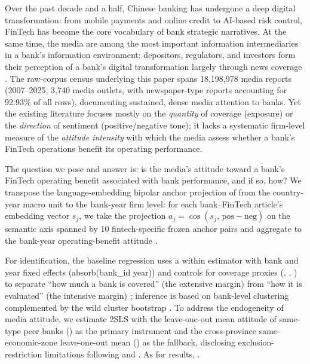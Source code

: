 Over the past decade and a half, Chinese banking has undergone a deep
digital transformation: from mobile payments and online credit to
AI-based risk control, FinTech has become the core vocabulary of bank
strategic narratives. At the same time, the media are among the most
important information intermediaries in a bank's information
environment: depositors, regulators, and investors form their
perception of a bank's digital transformation largely through news
coverage \parencite{tetlock2007content,fang2009media}. The raw-corpus
census underlying this paper spans 18{,}198{,}978 media reports
(2007--2025, 3{,}740 media outlets, with newspaper-type reports
accounting for 92.93\% of all rows), documenting sustained, dense media
attention to banks. Yet the existing literature focuses mostly on the
\emph{quantity} of coverage (exposure) or the \emph{direction} of
sentiment (positive/negative tone); it lacks a systematic firm-level
measure of the \emph{attitude intensity} with which the media assess
whether a bank's FinTech operations benefit its operating performance.

The question we pose and answer is: is the media's attitude toward a
bank's FinTech operating benefit associated with bank performance, and
if so, how? We transpose the language-embedding bipolar anchor
projection of \textcite{jha2026benefit} from the country-year macro
unit to the bank-year firm level: for each bank--FinTech article's
embedding vector $s_j$, we take the projection
$a_j=\cos(s_j,\,\mathrm{pos}-\mathrm{neg})$ on the semantic axis
spanned by 10 fintech-specific frozen anchor pairs and aggregate to the
bank-year operating-benefit attitude .

For identification, the baseline regression uses a within estimator
with bank and year fixed effects (absorb(bank\_id year)) and controls
for coverage proxies (, ,
) to separate ``how much a bank is covered'' (the
extensive margin) from ``how it is evaluated'' (the intensive margin)
\parencite{fang2009media}; inference is based on bank-level clustering
complemented by the wild cluster bootstrap
\parencite{roodman2019boottest}. To address the endogeneity of media
attitude, we estimate 2SLS with the leave-one-out mean attitude of
same-type peer banks () as the
primary instrument and the cross-province same-economic-zone
leave-one-out mean () as the
fallback, disclosing exclusion-restriction limitations following
\textcite{manski1993reflection} and \textcite{leary2014peer}. As for
results, \@.

